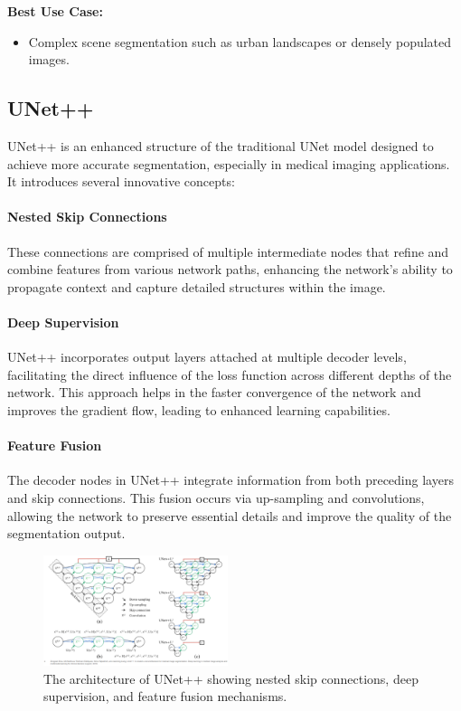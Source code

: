 \noindent \textbf{Best Use Case:}
\begin{itemize}
  \item Complex scene segmentation such as urban landscapes or densely populated images.
\end{itemize}

\subsection{UNet++}
UNet++ is an enhanced structure of the traditional UNet model designed to achieve more accurate segmentation, especially in medical imaging applications. It introduces several innovative concepts:

\paragraph{Nested Skip Connections}
These connections are comprised of multiple intermediate nodes that refine and combine features from various network paths, enhancing the network's ability to propagate context and capture detailed structures within the image.

\paragraph{Deep Supervision}
UNet++ incorporates output layers attached at multiple decoder levels, facilitating the direct influence of the loss function across different depths of the network. This approach helps in the faster convergence of the network and improves the gradient flow, leading to enhanced learning capabilities.

\paragraph{Feature Fusion}
The decoder nodes in UNet++ integrate information from both preceding layers and skip connections. This fusion occurs via up-sampling and convolutions, allowing the network to preserve essential details and improve the quality of the segmentation output.

\begin{figure}[h]
\centering
\includegraphics[width=0.48\textwidth]{images/unet_plus_architecture.png}
\caption{The architecture of UNet++ showing nested skip connections, deep supervision, and feature fusion mechanisms.}
\label{fig:unet_plus_architecture}
\end{figure}

